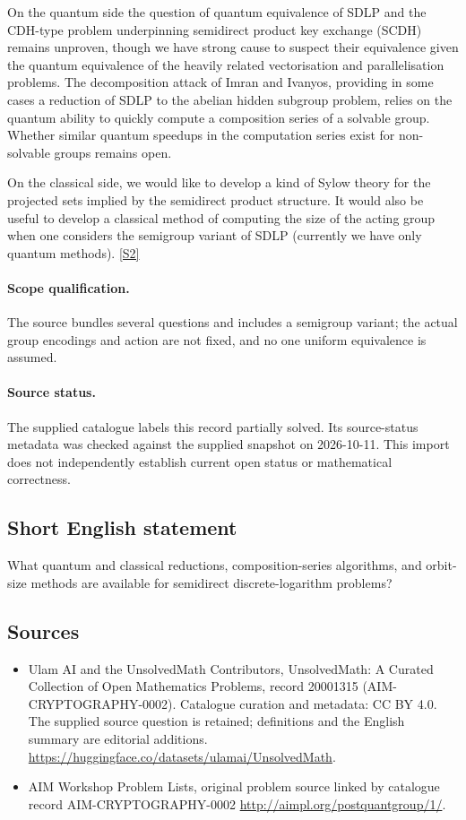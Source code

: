 \documentclass[11pt]{article}
\begin{document}
On the quantum side the question of quantum equivalence of SDLP and the CDH-type problem underpinning semidirect product key exchange (SCDH) remains unproven, though we have strong cause to suspect their equivalence given the quantum equivalence of the heavily related vectorisation and parallelisation problems. The decomposition attack of Imran and Ivanyos, providing in some cases a reduction of SDLP to the abelian hidden subgroup problem, relies on the quantum ability to quickly compute a composition series of a solvable group. Whether similar quantum speedups in the computation series exist for non-solvable groups remains open.

On the classical side, we would like to develop a kind of Sylow theory for the projected sets implied by the semidirect product structure. It would also be useful to develop a classical method of computing the size of the acting group when one considers the semigroup variant of SDLP (currently we have only quantum methods). \href{http://aimpl.org/postquantgroup/1/}{[S2]}
\paragraph{Scope qualification.}
The source bundles several questions and includes a semigroup variant; the actual group encodings and action are not fixed, and no one uniform equivalence is assumed.
\paragraph{Source status.}
The supplied catalogue labels this record partially solved. Its source-status metadata was checked against the supplied snapshot on 2026-10-11. This import does not independently establish current open status or mathematical correctness.
\subsection{Short English statement}
What quantum and classical reductions, composition-series algorithms, and orbit-size methods are available for semidirect discrete-logarithm problems?
\subsection{Sources}
\begin{itemize}
\item[S1] Ulam AI and the UnsolvedMath Contributors, UnsolvedMath: A Curated Collection of Open Mathematics Problems, record 20001315 (AIM-CRYPTOGRAPHY-0002). Catalogue curation and metadata: CC BY 4.0. The supplied source question is retained; definitions and the English summary are editorial additions.
\url{https://huggingface.co/datasets/ulamai/UnsolvedMath}.
\item[S2] AIM Workshop Problem Lists, original problem source linked by catalogue record AIM-CRYPTOGRAPHY-0002
\url{http://aimpl.org/postquantgroup/1/}.
\end{itemize}
\end{document}

